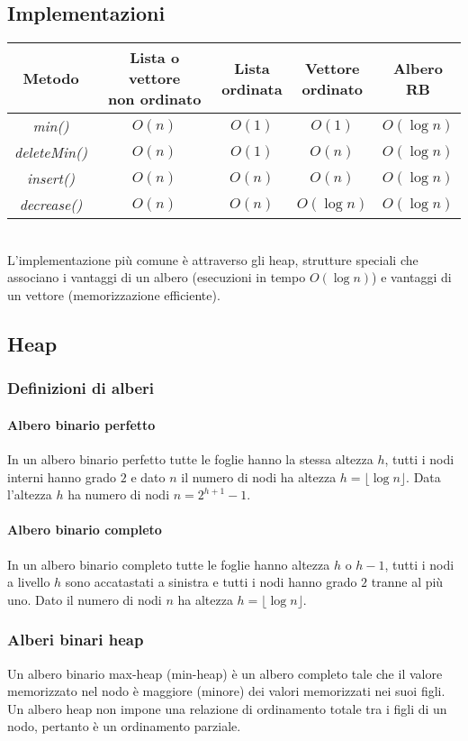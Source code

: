 \subsection{Implementazioni}
\begin{tabular}{|c|c|c|c|c|}
\hline
Metodo & \makecell{Lista o vettore \\non ordinato} & \makecell{Lista\\ordinata} & \makecell{Vettore\\ordinato} & \makecell{Albero\\RB}\\
\hline
\emph{min()} & $O(n)$ & $O(1)$ & $O(1)$ & $O(\log n)$\\
\hline
\emph{deleteMin()} & $O(n)$ & $O(1)$ & $O(n)$ & $O(\log n)$\\
\hline
\emph{insert()} & $O(n)$ & $O(n)$ & $O(n)$ & $O(\log n)$\\
\hline
\emph{decrease()} & $O(n)$ & $O(n)$ & $O(\log n)$ & $O(\log n)$\\
\hline
\end{tabular}\\
L'implementazione pi\`u comune \`e attraverso gli heap, strutture speciali che associano i vantaggi di un albero (esecuzioni in tempo $O(\log n)$) e 
vantaggi di un vettore (memorizzazione efficiente).
\subsection{Heap}
\subsubsection{Definizioni di alberi}
\paragraph{Albero binario perfetto}
In un albero binario perfetto tutte le foglie hanno la stessa altezza $h$, tutti i nodi interni hanno grado $2$ e dato $n$ il numero di nodi ha altezza
$h=\lfloor \log n\rfloor$. Data l'altezza $h$ ha numero di nodi $n=2^{h+1}-1$.
\paragraph{Albero binario completo}
In un albero binario completo tutte le foglie hanno altezza $h$ o $h-1$, tutti i nodi a livello $h$ sono accatastati a sinistra e tutti i nodi hanno grado 
$2$ tranne al pi\`u uno. Dato il numero di nodi $n$ ha altezza $h=\lfloor \log n\rfloor$.
\subsubsection{Alberi binari heap}
Un albero binario max-heap (min-heap) \`e un albero completo tale che il valore memorizzato nel nodo \`e maggiore (minore) dei valori memorizzati nei suoi
figli. Un albero heap non impone una relazione di ordinamento totale tra i figli di un nodo, pertanto \`e un ordinamento parziale. 
